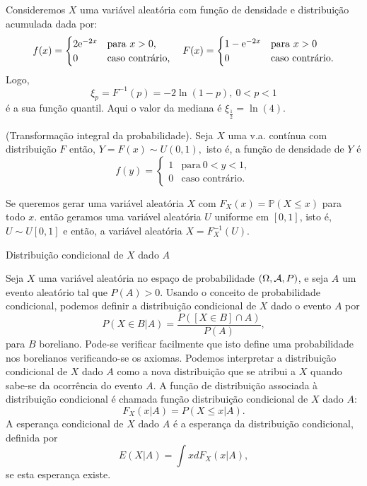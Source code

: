 \begin{frame}
	\begin{exem}
		Consideremos $X$ uma variável aleatória com função de densidade e distribuição acumulada  dada por:
		$$
		f(x)=
		\begin{cases}
		2{\rm e}^{-2x} & \text{para} \ x>0, \\
		0 & \text{caso contrário},
		\end{cases}
		\quad 
		F(x)=
		\begin{cases}
		1-{\rm e}^{-2x} & \text{para} \ x>0 \\
		0 & \text{caso contrário}.
		\end{cases}
		$$
		Logo, 
		$$\xi_p=F^{-1}(p) =-2 \ln(1-p), \ 0<p<1$$ é a sua função quantil. Aqui o valor da mediana é $\xi_{\frac{1}{2}}=\ln(4).$ 
	\end{exem}
	
	\begin{teo}{(Transformação integral da probabilidade).}  
		Seja $X$ uma v.a. contínua com distribuição $F$ então, $Y=F(x) \sim U(0,1),$ isto é, a função de densidade de $Y$ é 
		$$
		f(y)=
		\begin{cases}
		1 & \text{para} \ 0<y<1, \\
		0 & \text{caso contrário}.
		\end{cases}
		$$
	\end{teo}
	\begin{nota}
		Se queremos gerar uma variável aleatória $ X $ com $ F_X(x) = \mathbb{P}(X\leq x) $ para todo $ x $. então  geramos uma variável aleatória $ U $ uniforme em $ [0,1] $, isto é, $ U\sim U[0,1] $ e então, a variável aleatória $ X = F_X^{-1}(U).$
	\end{nota}
\end{frame}




\begin{frame}

\begin{block}{Distribuição condicional de $X$ dado $A$}
	
	Seja $X$ uma variável aleatória no espaço de probabilidade
	$(\Omega,{\cal A},P)$, e seja $A$ um evento aleatório tal que $P(A)>0$.
	Usando o conceito de probabilidade condicional, podemos definir a
	distribuição condicional de $X$ dado o evento $A$ por
	$$P(X\in B|A)=\frac{P([X\in B]\cap A)}{P(A)},$$
	para $B$ boreliano. Pode-se verificar facilmente que isto define uma
	probabilidade nos borelianos verificando-se os axiomas. Podemos
	interpretar a distribuição condicional de $X$ dado $A$ como a nova
	distribuição que se atribui a $X$ quando sabe-se da ocorrência do
	evento $A$. A função de distribuição associada à distribuição
	condicional é chamada função distribuição condicional de $X$ dado
	$A$:
	$$F_X(x|A)=P(X\leq x|A).$$
	A esperança condicional de $X$ dado $A$ é a esperança da
	distribuição condicional, definida por
	$$E(X|A)=\int xdF_X(x|A),$$
	se esta esperança existe.
	
\end{block}
\end{frame}

